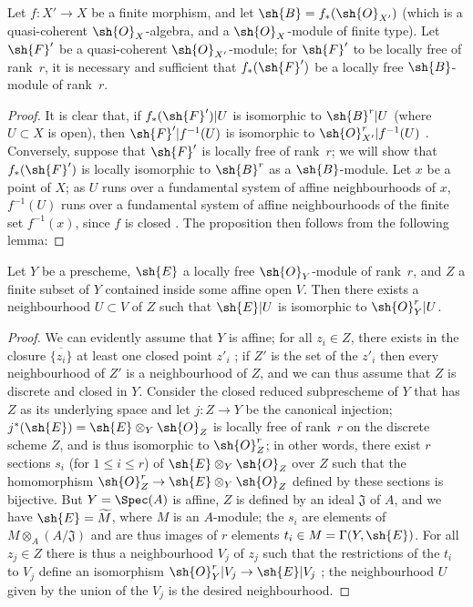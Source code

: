 \begin{proposition}[6.1.12]
\label{II.6.1.12}
Let $f:X'\to X$ be a finite morphism, and let $\sh{B}=f_*(\sh{O}_{X'})$ (which is a quasi-coherent $\sh{O}_X$-algebra, and a $\sh{O}_X$-module of finite type).
Let $\sh{F}'$ be a quasi-coherent $\sh{O}_{X'}$-module;
for $\sh{F}'$ to be locally free of rank~$r$, it is necessary and sufficient that $f_*(\sh{F}')$ be a locally free $\sh{B}$-module of rank~$r$.
\end{proposition}

\begin{proof}
It is clear that, if $f_*(\sh{F}')|U$ is isomorphic to $\sh{B}^r|U$ (where $U\subset X$ is open), then $\sh{F}'|f^{-1}(U)$ is isomorphic to $\sh{O}_{X'}^r|f^{-1}(U)$ .
Conversely, suppose that $\sh{F}'$ is locally free of rank~$r$; we will show that $f_*(\sh{F}')$ is locally isomorphic to $\sh{B}^r$ as a $\sh{B}$-module.
Let $x$ be a point of $X$;
as $U$ runs over a fundamental system of affine neighbourhoods of $x$, $f^{-1}(U)$ runs over a fundamental system of affine neighbourhoods  of the finite set $f^{-1}(x)$, since $f$ is closed .
The proposition then follows from the following lemma:
\end{proof}

\begin{lemma}[6.1.12.1]
\label{II.6.1.12.1}
Let $Y$ be a prescheme, $\sh{E}$ a locally free $\sh{O}_Y$-module of rank~$r$, and $Z$ a finite subset of $Y$ contained inside some affine open $V$.
Then there exists a neighbourhood $U\subset V$ of $Z$ such that $\sh{E}|U$ is isomorphic to $\sh{O}_Y^r|U$.
\end{lemma}

\begin{proof}
We can evidently assume that $Y$ is affine;
for all $z_i\in Z$, there exists in the closure $\overline{\{z_i\}}$ at least one closed point $z'_i$ ;
if $Z'$ is the set of the $z'_i$ then every neighbourhood of $Z'$ is a neighbourhood of $Z$, and we can thus assume that $Z$ is discrete and closed in $Y$.
Consider the closed reduced subprescheme of $Y$ that has $Z$ as its underlying space  and let $j:Z\to Y$ be the canonical injection;
$j^*(\sh{E})=\sh{E}\otimes_Y\sh{O}_Z$ is locally free of rank~$r$ on the discrete scheme $Z$, and is thus isomorphic to $\sh{O}_Z^r$;
in other words, there exist $r$ sections $s_i$ (for $1\leq i\leq r$) of $\sh{E}\otimes_Y\sh{O}_Z$ over $Z$ such that the homomorphism $\sh{O}_Z^r\to\sh{E}\otimes_Y\sh{O}_Z$ defined by these sections is bijective.
But $Y=\Spec(A)$ is affine, $Z$ is defined by an ideal $\mathfrak{J}$ of $A$, and we have $\sh{E}=\widetilde{M}$, where $M$ is an $A$-module;
the $s_i$ are elements of $M\otimes_A(A/\mathfrak{J})$ and are thus images of $r$ elements $t_i\in M=\Gamma(Y,\sh{E})$.
For all $z_j\in Z$ there is thus a neighbourhood $V_j$ of $z_j$ such that the restrictions of the $t_i$ to $V_j$ define an isomorphism $\sh{O}_Y^r|V_j\to\sh{E}|V_j$ ;
the neighbourhood $U$ given by the union of the $V_j$ is the desired neighbourhood.
\end{proof}

